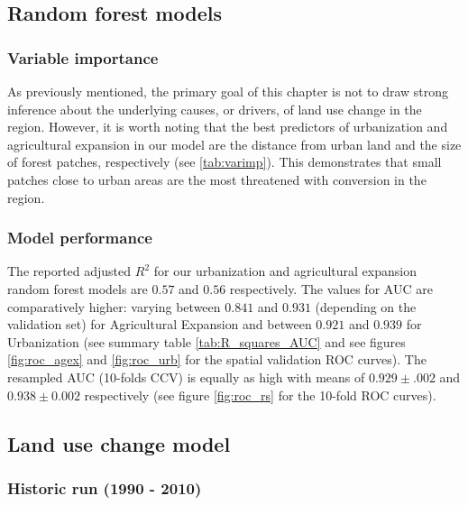 \subsection{Random forest models}

\subsubsection{Variable importance}

As previously mentioned, the primary goal of this chapter is not to draw strong inference about the underlying causes, or drivers, of land use change in the region. However, it is worth noting that the best predictors of urbanization and agricultural expansion in our model are the distance from urban land and the size of forest patches, respectively (see \ref{tab:varimp}). This demonstrates that small patches close to urban areas are the most threatened with conversion in the region. \\

\subsubsection{Model performance}

The reported adjusted  $R^{2}$ for our urbanization and agricultural expansion random forest models are $0.57$ and $0.56$ respectively. The values for AUC are comparatively higher: varying between $0.841$ and $0.931$ (depending on the validation set) for Agricultural Expansion and between $0.921$ and $0.939$ for Urbanization (see summary table \ref{tab:R_squares_AUC} and see figures \ref{fig:roc_agex} and \ref{fig:roc_urb} for the spatial validation ROC curves). The resampled AUC (10-folds CCV) is equally as high with means of $0.929 \pm .002$ and $0.938 \pm 0.002$ respectively (see figure \ref{fig:roc_rs} for the 10-fold ROC curves).\\

\subsection{Land use change model}

\subsubsection*{Historic run (1990 - 2010)}

